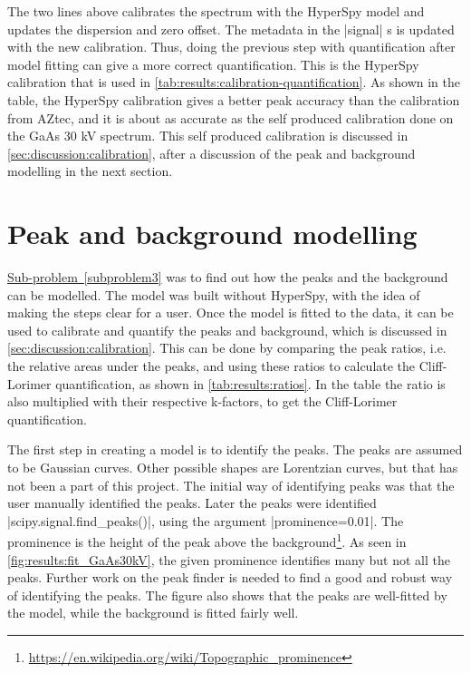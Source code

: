 The two lines above calibrates the spectrum with the HyperSpy model and updates the dispersion and zero offset.
The metadata in the \cverb|signal| s is updated with the new calibration.
Thus, doing the previous step with quantification after model fitting can give a more correct quantification.
This is the HyperSpy calibration that is used in \cref{tab:results:calibration-quantification}.
As shown in the table, the HyperSpy calibration gives a better peak accuracy than the calibration from AZtec, and it is about as accurate as the self produced calibration done on the GaAs 30 kV spectrum.
This self produced calibration is discussed in \cref{sec:discussion:calibration}, after a discussion of the peak and background modelling in the next section.












\section{Peak and background modelling}
\label{sec:discussion:modelling}


\hyperref[subproblem3]{Sub-problem~\ref*{subproblem3}} was to find out how the peaks and the background can be modelled.
The model was built without HyperSpy, with the idea of making the steps clear for a user.
Once the model is fitted to the data, it can be used to calibrate and quantify the peaks and background, which is discussed in \cref{sec:discussion:calibration}.
This can be done by comparing the peak ratios, i.e. the relative areas under the peaks, and using these ratios to calculate the Cliff-Lorimer quantification, as shown in \cref{tab:results:ratios}.
In the table the ratio is also multiplied with their respective k-factors, to get the Cliff-Lorimer quantification.

The first step in creating a model is to identify the peaks.
The peaks are assumed to be Gaussian curves.
Other possible shapes are Lorentzian curves, but that has not been a part of this project.
The initial way of identifying peaks was that the user manually identified the peaks.
Later the peaks were identified \cverb|scipy.signal.find_peaks()|, using the argument \cverb|prominence=0.01|.
The prominence is the height of the peak above the background\footnote{\url{https://en.wikipedia.org/wiki/Topographic_prominence}}.
As seen in \cref{fig:results:fit_GaAs30kV}, the given prominence identifies many but not all the peaks.
Further work on the peak finder is needed to find a good and robust way of identifying the peaks.
The figure also shows that the peaks are well-fitted by the model, while the background is fitted fairly well.



